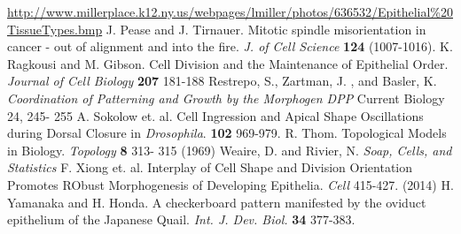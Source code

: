 \begin{thebibliography}{1}
 \url{http://www.millerplace.k12.ny.us/webpages/lmiller/photos/636532/Epithelial\%20TissueTypes.bmp}
 J. Pease and J. Tirnauer. Mitotic spindle misorientation in cancer - out of alignment and into the fire. \emph{J. of Cell Science} \textbf{124} (1007-1016).
 K. Ragkousi and M. Gibson. Cell Division and the Maintenance of Epithelial Order. \emph{Journal of Cell Biology} \textbf{207} 181-188
 Restrepo, S., Zartman, J. , and Basler, K. \emph{ Coordination of Patterning and Growth by the Morphogen DPP} Current Biology 24, 245- 255
 A. Sokolow et. al. Cell Ingression and Apical Shape Oscillations during Dorsal Closure in \emph{Drosophila}. \textbf{102} 969-979.
 R. Thom. Topological Models in Biology. \emph{Topology} \textbf{8} 313- 315 (1969)
 Weaire, D. and Rivier, N. \emph{Soap, Cells, and Statistics}
 F. Xiong et. al. Interplay of Cell Shape and Division Orientation Promotes RObust Morphogenesis of Developing Epithelia. \emph{Cell}  415-427. (2014)
 H. Yamanaka and H. Honda. A checkerboard pattern manifested by the oviduct epithelium of the Japanese Quail. \emph{Int. J. Dev. Biol.} \textbf{34} 377-383.
\end{thebibliography}


